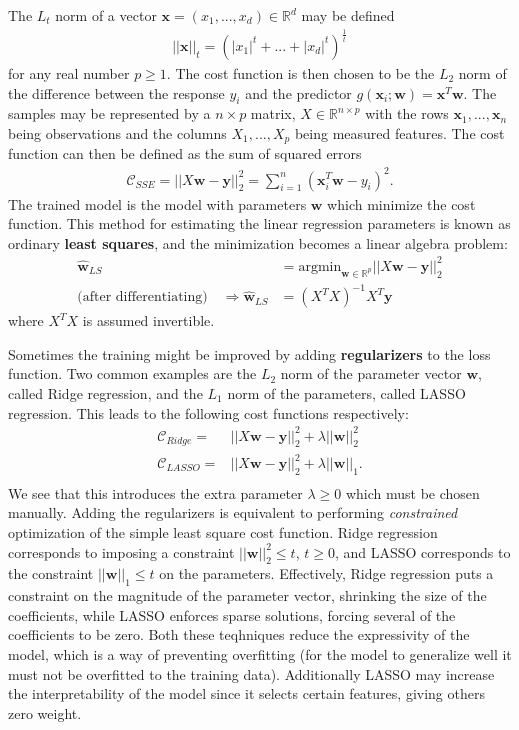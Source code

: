 \documentclass[twoside,english]{uiofysmaster}
\begin{document}
The $L_t$ norm of a vector $\bm{x} = (x_1, ..., x_d) \in \mathbb{R}^d$ may be defined
\begin{align}
	||\bm{x} ||_t = (|x_1|^t +...+ |x_d|^t )^{\frac{1}{t}}
\end{align}
for any real number $p\geq 1$. The cost function is then chosen to be the $L_2$ norm of the difference between the response $y_i$ and the predictor $g(\bm{x}_i; \bm{w}) = \bm{x}^T \bm{w}$.
The samples may be represented by a $n\times p$ matrix, $X \in \mathbb{R}^{n\times p}$ with the rows
$\bm{x}_1, ..., \bm{x}_n$ being observations and the columns $X_1, ..., X_p$ being measured features. The cost function can then be defined as the sum of squared errors
\begin{align}
	 \mathcal{C}_{SSE} = ||X\mathbf{w} - \mathbf{y}||_2^2 =  \sum_{i=1}^n (\mathbf{x}_i^T \mathbf{w} - y_i)^2 .
\end{align}
The trained model is the model with parameters $\bm{w}$ which minimize the cost function. This method for estimating the linear regression parameters is known as ordinary \textbf{least squares}, and the minimization becomes a linear algebra problem:
\begin{align}
	\hat{\mathbf{w}}_{LS} &= \text{argmin}_{\mathbf{w} \in \mathbb{R}^p} ||X\mathbf{w} - \mathbf{y}||_2^2 \\
	\text{(after differentiating)} \quad \Rightarrow  \hat{\mathbf{w}}_{LS} &= (X^T X)^{-1} X^T \mathbf{y} 
\end{align}
where $X^T X$ is assumed invertible. 

Sometimes the training might be improved by adding \textbf{regularizers} to the loss function. Two common examples are the $L_2$ norm of the parameter vector $\bm{w}$, called Ridge regression, and the $L_1$ norm of the parameters, called LASSO regression. This leads to the following cost functions respectively:
\begin{align}
	\mathcal{C}_{Ridge} =& ||X\mathbf{w} - \mathbf{y}||_2^2 + \lambda || \bm{w}||_2^2 \\
	\mathcal{C}_{LASSO} =& ||X\mathbf{w} - \mathbf{y}||_2^2 + \lambda || \bm{w}||_1 . \\
\end{align}
We see that this introduces the extra parameter $\lambda \geq 0$ which must be chosen manually. Adding the regularizers is equivalent to performing \textit{constrained} optimization of the simple least square cost function. Ridge regression corresponds to imposing a constraint $|| \bm{w}||_2^2 \leq t$, $t\geq 0$, and LASSO corresponds to the constraint $|| \bm{w}||_1 \leq t$ on the parameters. Effectively, Ridge regression puts a constraint on the magnitude of the parameter vector, shrinking the size of the coefficients, while LASSO enforces sparse solutions, forcing several of the coefficients to be zero. Both these teqhniques reduce the expressivity of the model, which is a way of preventing overfitting (for the model to generalize well it must not be overfitted to the training data). Additionally LASSO may increase the interpretability of the model since it selects certain features, giving others zero weight.
\end{document}

